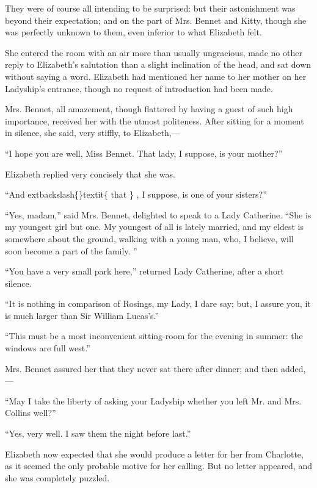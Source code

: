 \documentclass[10pt]{book}
\begin{document}
   They were of course all intending to be surprised: but their
astonishment was beyond their expectation; and on the part of Mrs.
Bennet and Kitty, though she was perfectly unknown to them, even
inferior to what Elizabeth felt.
  

   She entered the room with an air more than usually ungracious, made no
other reply to Elizabeth’s salutation than a slight inclination of the
head, and sat down without saying a word. Elizabeth had mentioned her
name to her mother on her Ladyship’s entrance, though no request of
introduction had been made.
  

   Mrs. Bennet, all amazement, though flattered by having a guest of such
high importance, received her with the utmost politeness. After sitting
for a moment in silence, she said, very stiffly, to Elizabeth,—
  

   “I hope you are well, Miss Bennet. That lady, I suppose, is your
mother?”
  

   Elizabeth replied very concisely that she was.
  

   “And
   	extbackslash\{\}textit\{
    that
   \}
   , I suppose, is one of your sisters?”
  

   “Yes, madam,” said Mrs. Bennet, delighted to speak to a Lady Catherine.
“She is my youngest girl but one. My youngest of all is lately married,
and my eldest is somewhere about the ground, walking with a young man,
who, I believe, will soon become a part of the family.
   ”
  

   “You have a very small park here,” returned Lady Catherine, after a
short silence.
  

   “It is nothing in comparison of Rosings, my Lady, I dare say; but, I
assure you, it is much larger than Sir William Lucas’s.”
  

   “This must be a most inconvenient sitting-room for the evening in
summer: the windows are full west.”
  

   Mrs. Bennet assured her that they never sat there after dinner; and then
added,—
  

   “May I take the liberty of asking your Ladyship whether you left Mr. and
Mrs. Collins well?”
  

   “Yes, very well. I saw them the night before last.”
  

   Elizabeth now expected that she would produce a letter for her from
Charlotte, as it seemed the only probable motive for her calling. But no
letter appeared, and she was completely puzzled.
  
\end{document}
